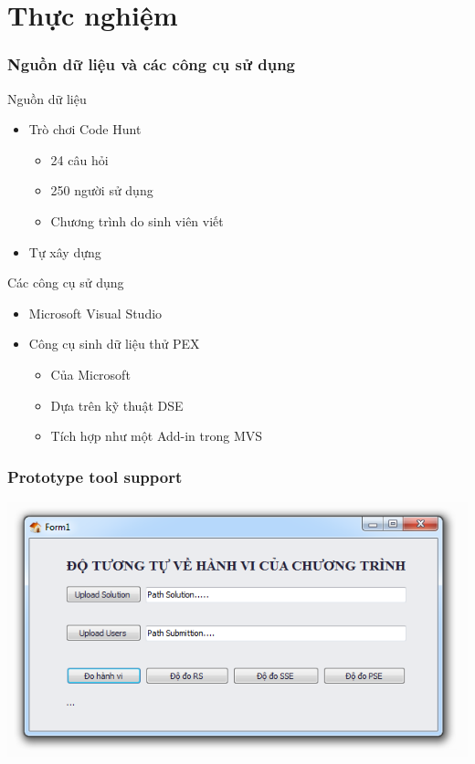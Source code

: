 \documentclass{beamer}
\begin{document}
\section{Thực nghiệm}

\begin{frame}
  \frametitle{Nguồn dữ liệu và các công cụ sử dụng}
  \begin{block}{Nguồn dữ liệu}
    \begin{itemize}
    \item Trò chơi Code Hunt
      \begin{itemize}
      \item 24 câu hỏi
      \item 250 người sử dụng
      \item Chương trình do sinh viên viết
      \end{itemize}
    \item Tự xây dựng
    \end{itemize}
  \end{block} \pause
  \begin{block}{Các công cụ sử dụng}
    \begin{itemize}
    \item Microsoft Visual Studio
    \item Công cụ sinh dữ liệu thử PEX
      \begin{itemize}
      \item Của Microsoft
      \item Dựa trên kỹ thuật DSE
      \item Tích hợp như một Add-in trong MVS
      \end{itemize}
    \end{itemize}
  \end{block}
\end{frame}

\begin{frame}
  \frametitle{Prototype tool support}
 
  \centering
  \includegraphics[width=\linewidth]{images/main.png}
  
\end{frame}
\end{document}
